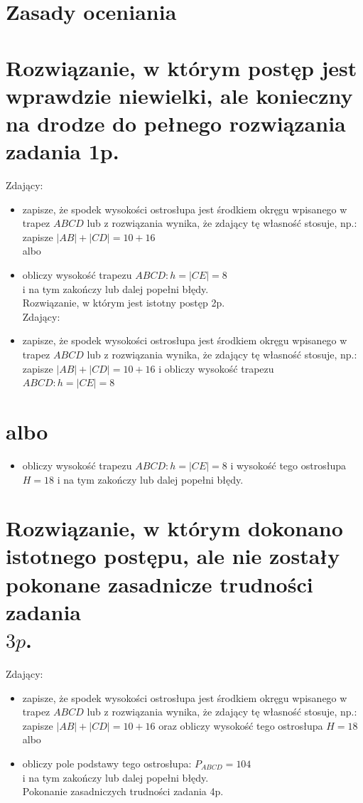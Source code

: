 \documentclass[10pt]{article}
\begin{document}
\section*{Zasady oceniania}
\section*{Rozwiązanie, w którym postęp jest wprawdzie niewielki, ale konieczny na drodze do pełnego rozwiązania zadania 1p.}
Zdający:

\begin{itemize}
  \item zapisze, że spodek wysokości ostrosłupa jest środkiem okręgu wpisanego w trapez $A B C D$ lub z rozwiązania wynika, że zdający tę własność stosuje, np.: zapisze $|A B|+|C D|=10+16$\\
albo
  \item obliczy wysokość trapezu $A B C D: h=|C E|=8$\\
i na tym zakończy lub dalej popełni błędy.\\
Rozwiązanie, w którym jest istotny postęp 2p.\\
Zdający:
  \item zapisze, że spodek wysokości ostrosłupa jest środkiem okręgu wpisanego w trapez $A B C D$ lub z rozwiązania wynika, że zdający tę własność stosuje, np.: zapisze $|A B|+|C D|=10+16$ i obliczy wysokość trapezu $A B C D: h=|C E|=8$
\end{itemize}

\section*{albo}
\begin{itemize}
  \item obliczy wysokość trapezu $A B C D: h=|C E|=8$ i wysokość tego ostrosłupa $H=18$ i na tym zakończy lub dalej popełni błędy.
\end{itemize}

\section*{Rozwiązanie, w którym dokonano istotnego postępu, ale nie zostały pokonane zasadnicze trudności zadania \\
 $3 p$.}
Zdający:

\begin{itemize}
  \item zapisze, że spodek wysokości ostrosłupa jest środkiem okręgu wpisanego w trapez $A B C D$ lub z rozwiązania wynika, że zdający tę własność stosuje, np.: zapisze $|A B|+|C D|=10+16$ oraz obliczy wysokość tego ostrosłupa $H=18$\\
albo
  \item obliczy pole podstawy tego ostrosłupa: $P_{A B C D}=104$\\
i na tym zakończy lub dalej popełni błędy.\\
Pokonanie zasadniczych trudności zadania 4p.
\end{itemize}
\end{document}
